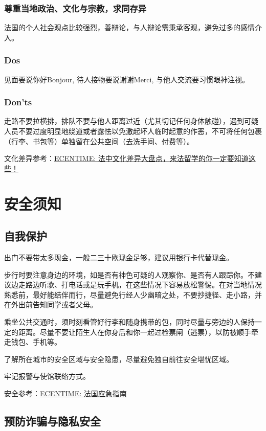 \documentclass[UTF8]{ctexart}
\begin{document}
\subsubsection{尊重当地政治、文化与宗教，求同存异}
法国的个人社会观点比较强烈，善辩论，与人辩论需秉承客观，避免过多的感情介入。

\subsubsection{Dos}
见面要说你好Bonjour, 待人接物要说谢谢Merci, 与他人交流要习惯眼神注视。

\subsubsection{Don'ts}
走路不要拉横排，排队不要与他人距离过近（尤其切记任何身体触碰），遇到可疑人员不要过度明显地绕道或者露怯以免激起坏人临时起意的作恶，不可将任何包裹（行李、书包等）单独留在公共空间（去洗手间、付费等）。

文化差异参考：\href{https://www.ecentime.com/article/difference-culturelle}{ECENTIME: 法中文化差异大盘点，来法留学的你一定要知道这些！}

\newpage
\section{安全须知}
\subsection{自我保护}
出门不要带太多现金，一般二三十欧现金足够，建议用银行卡代替现金。

步行时要注意身边的环境，如是否有神色可疑的人观察你、是否有人跟踪你。不建议边走路边听歌、打电话或是玩手机，在这些情况下容易放松警惕。在对当地情况熟悉前，最好能结伴而行，尽量避免行经人少幽暗之处，不要抄捷径、走小路，并在外出前告知同学或者父母。

乘坐公共交通时，须时刻看管好行李和随身携带的包，同时尽量与旁边的人保持一定的距离。尽量不要让陌生人在你身后和你一起过检票闸（逃票），以防被顺手牵走钱包、手机等。

了解所在城市的安全区域与安全隐患，尽量避免独自前往安全堪忧区域。

牢记报警与使馆联络方式。

安全参考：\href{https://www.ecentime.com/article/GuideUrgenceFrance}{ECENTIME: 法国应急指南}
 

\subsection{预防诈骗与隐私安全}
\end{document}
